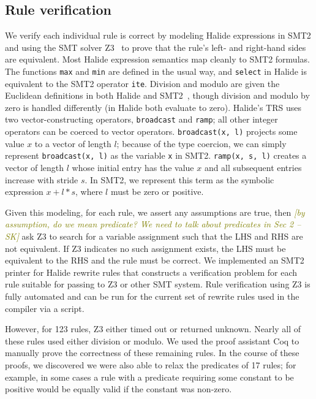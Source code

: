 \documentclass[acmsmall,review,anonymous]{acmart}\settopmatter{printfolios=true,printccs=false,printacmref=false}
\newcommand{\sak}[1]{\textcolor{olive}{\textit{[{#1} --SK]}}}
\newcommand{\NumPredicatesRelaxed}{{\color{black} 17}\xspace}
\begin{document}
\subsection{Rule verification}

We verify each individual rule is correct by modeling Halide
expressions in SMT2 and using the SMT solver Z3~\cite{de2008z3} to
prove that the rule's left- and right-hand sides are equivalent. Most Halide expression
semantics map cleanly to SMT2 formulas. The functions \texttt{max} and
\texttt{min} are defined in the usual way, and \texttt{select} in
Halide is equivalent to the SMT2 operator \texttt{ite}. Division and
modulo are given the Euclidean definitions in both Halide and
SMT2~\cite{boute1992euclidean}, though division and modulo by zero is handled
differently (in Halide both evaluate to zero).
Halide's TRS uses two vector-constructing operators, \texttt{broadcast} and \texttt{ramp}; all
other integer operators can be coerced to vector operators. 
\texttt{broadcast(x, l)} projects some value $x$ to a vector of length $l$; because of
the type coercion, we can simply represent \texttt{broadcast(x, l)} as the variable
\texttt{x} in SMT2. \texttt{ramp(x, s, l)} creates a vector of length $l$
whose initial entry has the value $x$ and all subsequent entries increase with
stride $s$. In SMT2, we represent this term as the symbolic expression $x + l *
s$, where $l$ must be zero or positive.

Given this modeling, for each rule, we assert any assumptions are true, then
\sak{by assumption, do we mean predicate?  We need to talk about predicates in Sec 2}
ask Z3 to search for a variable assignment such that the LHS and RHS are not
equivalent.  If Z3 indicates no such assignment exists, the LHS must be equivalent to
the RHS and the rule must be correct. We implemented an SMT2 printer for 
Halide rewrite rules that constructs a verification problem for each rule
suitable for passing to Z3 or other SMT system.  Rule verification using Z3 is fully automated
and can be run for the current set of rewrite rules used in the compiler via a script.

However, for 123
rules, Z3 either timed out or returned unknown. Nearly all of these rules used
either division or modulo. We used the proof assistant Coq to manually prove the
correctness of these remaining rules. In the course of these proofs, we
discovered we were also able to relax the predicates of \NumPredicatesRelaxed
rules; for example, in some cases a rule
with a predicate requiring some constant to be positive would be equally valid
if the constant was non-zero.
\end{document}
